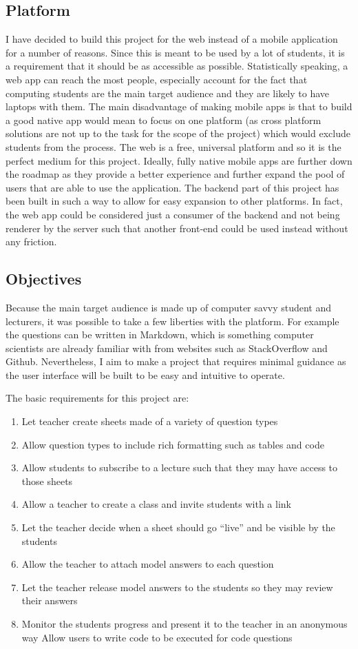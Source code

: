 \documentclass[11pt]{informatics-report}
\begin{document}
\subsection{Platform}
I have decided to build this project for the web instead of a mobile application for a number of reasons. Since this is meant to be used by a lot of students, it is a requirement that it should be as accessible as possible. Statistically speaking, a web app can reach the most people, especially account for the fact that computing students are the main target audience and they are likely to have laptops with them.
The main disadvantage of making mobile apps is that to build a good native app would mean to focus on one platform (as cross platform solutions are not up to the task for the scope of the project) which would exclude students from the process. The web is a free, universal platform and so it is the perfect medium for this project.
Ideally, fully native mobile apps are further down the roadmap as they provide a better experience and further expand the pool of users that are able to use the application.
The backend part of this project has been built in such a way to allow for easy expansion to other platforms. In fact, the web app could be considered just a consumer of the backend and not being renderer by the server such that another front-end could be used instead without any friction.



\subsection{Objectives}
Because the main target audience is made up of computer savvy student and lecturers, it was possible to take a few liberties with the platform. For example the questions can be written in Markdown, which is something computer scientists are already familiar with from websites such as StackOverflow and Github.
Nevertheless, I aim to make a project that requires minimal guidance as the user interface will be built to be easy and intuitive to operate.

The basic requirements for this project are:
\begin{enumerate}
\item Let teacher create sheets made of a variety of question types
\item 	Allow question types to include rich formatting such as tables and code
\item 	Allow students to subscribe to a lecture such that they may have access to those sheets
\item 	Allow a teacher to create a class and invite students with a link
\item 	Let the teacher decide when a sheet should go “live” and be visible by the students
\item 	Allow the teacher to attach model answers to each question
\item Let the teacher release model answers to the students so they may review their answers
\item 	Monitor the students progress and present it to the teacher in an anonymous way
Allow users to write code to be executed for code questions

\end{enumerate}
\end{document}
